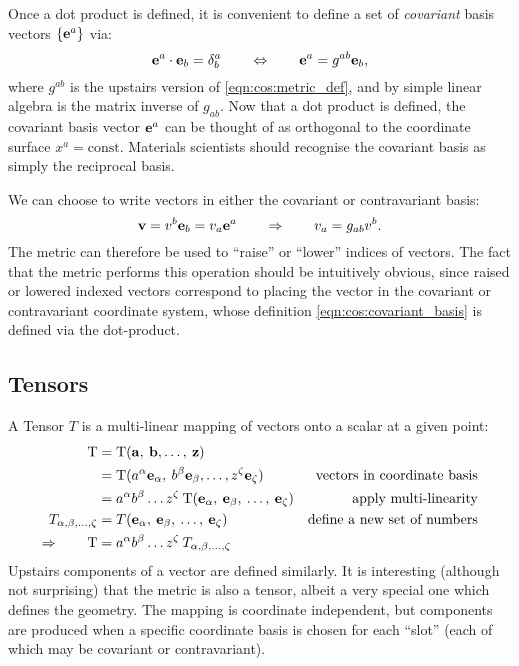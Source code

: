 Once a dot product is defined, it is convenient to define a set of {\em covariant\/} basis vectors $\{\mathbf{e}^a\}$ via:
\begin{equation}
  \mathbf{e}^a \cdot \mathbf{e}_b = \delta^a_b 
  \qquad\Leftrightarrow\qquad
  \mathbf{e}^a = g^{ab} \mathbf{e}_b,
  \label{eqn:cos:covariant_basis}
\end{equation}
where $g^{ab}$ is the upstairs version of \eqref{eqn:cos:metric_def}, and by simple linear algebra is the matrix inverse of $g_{ab}$. Now that a dot product is defined, the covariant basis vector $\mathbf{e}^a$ can be thought of as orthogonal to the coordinate surface $x^a=\mathrm{const}$. Materials scientists should recognise the covariant basis as simply the reciprocal basis. 

We can choose to write vectors in either the covariant or contravariant basis:
\begin{equation}
  \mathbf{v}=v^b \mathbf{e}_b = v_a \mathbf{e}^a 
  \qquad\Rightarrow\qquad
  v_a = g_{ab} v^b.
  \label{eqn:cos:covariant_vector}
\end{equation}
The metric can therefore be used to ``raise'' or ``lower'' indices of vectors. The fact that the metric performs this operation should be intuitively obvious, since raised or lowered indexed vectors correspond to placing the vector in the covariant or contravariant coordinate system, whose definition \eqref{eqn:cos:covariant_basis} is defined via the dot-product.

\subsection{Tensors}
A Tensor $T$ is a multi-linear mapping of vectors onto a scalar at a given point:
\begin{align}
  \mathrm{T} 
  &= 
  \mathrm{T}(\mathbf{a},\:\mathbf{b},\ldots,\:\mathbf{z})
  &
  \nonumber
  \\
  &= 
  \mathrm{T}(a^\alpha\mathbf{e}_\alpha,\:b^\beta\mathbf{e}_\beta,\ldots,z^\zeta\mathbf{e}_\zeta)  
  &\text{vectors in coordinate basis}
  \nonumber
  \\
  &= 
  a^\alpha b^\beta \ldots z^\zeta \: 
  \mathrm{T}(\mathbf{e}_\alpha,\:\mathbf{e}_\beta,\:\ldots,\:\mathbf{e}_\zeta)  
  &\text{apply multi-linearity}
  \nonumber
  \\
  T_{\alpha,\beta,\ldots,\zeta} 
  &=  
  T(\mathbf{e}_\alpha,\:\mathbf{e}_\beta,\:\ldots,\:\mathbf{e}_\zeta)
  &\text{define a new set of numbers}
  \nonumber
  \\
  \Rightarrow\qquad
  \mathrm{T}
  &= 
  a^\alpha b^\beta \ldots z^\zeta \: 
  T_{\alpha,\beta,\ldots,\zeta}
  &
  \nonumber
\end{align}
Upstairs components of a vector are defined similarly. It is interesting (although not surprising) that the metric is also a tensor, albeit a very special one which defines the geometry. The mapping is coordinate independent, but components are produced when a specific coordinate basis is chosen for each ``slot'' (each of which may be covariant or contravariant).


